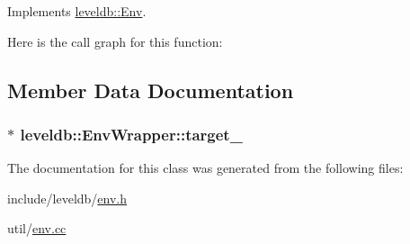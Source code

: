 Implements \hyperlink{classleveldb_1_1_env_a194a2ee3c21bc0b204ad0e5bc3b81d4b}{leveldb\-::\-Env}.



Here is the call graph for this function\-:




\subsection{Member Data Documentation}
\hypertarget{classleveldb_1_1_env_wrapper_aa5f60f55ace84b8c311ba543025dbcdc}{
\subsubsection[{target\-\_\-}]{$\ast$ leveldb\-::\-Env\-Wrapper\-::target\-\_\-\hspace{0.3cm}{\ttfamily [private]}}}\label{classleveldb_1_1_env_wrapper_aa5f60f55ace84b8c311ba543025dbcdc}


The documentation for this class was generated from the following files\-:\begin{DoxyCompactItemize}
\item 
include/leveldb/\hyperlink{env_8h}{env.\-h}\item 
util/\hyperlink{env_8cc}{env.\-cc}\end{DoxyCompactItemize}

